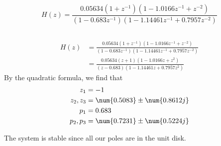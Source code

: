 \documentclass{article}
\let\Re\relax
\DeclareMathOperator{\Re}{\mathfrak{R}}
\let\Im\relax
\DeclareMathOperator{\Im}{\mathfrak{I}}
\begin{document}
\begin{equation}
    H(z) = \frac{\num{0.05634} (1 + z^{-1}) (1 - \num{1.0166} z^{-1} + z^{-2})}{(1 - \num{0.683} z^{-1}) (1 - \num{1.14461} z^{-1} + \num{0.7957} z^{-2})}
\end{equation}

\subsection{}

\begin{align}
    H(z) &= \frac{\num{0.05634} (1 + z^{-1}) (1 - \num{1.0166} z^{-1} + z^{-2})}{(1 - \num{0.683} z^{-1}) (1 - \num{1.14461} z^{-1} + \num{0.7957} z^{-2})} \\
    &= \frac{\num{0.05634} (z + 1) (1 - \num{1.0166} z + z^2)}{(z - \num{0.683}) (1 - \num{1.14461} z + \num{0.7957} z^2)}
\end{align}
By the quadratic formula, we find that
\begin{align}
    z_1 &= -1 \\
    z_2, z_3 &= \num{0.5083} \pm \num{0.8612j} \\
    p_1 &= 0.683 \\
    p_2, p_3 &= \num{0.7231} \pm \num{0.5224j}
\end{align}

\begin{center}
\end{center}
The system is stable since all our poles are in the unit disk.

\subsection{}
\end{document}
